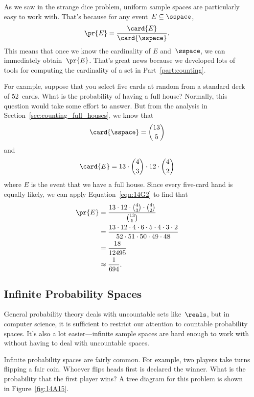 As we saw in the strange dice problem, uniform sample spaces are
particularly easy to work with.  That's because for any event~$E
\subseteq \sspace$,
\begin{equation}\label{eqn:14G2}
    \pr{E} = \frac{\card{E}}{\card{\sspace}}.
\end{equation}
This means that once we know the cardinality of $E$ and~$\sspace$, we
can immediately obtain~$\pr{E}$.  That's great news because we
developed lots of tools for computing the cardinality of a set in
Part~\ref{part:counting}.

For example, suppose that you select five cards at random from a
standard deck of 52~cards.  What is the probability of having a full
house?  Normally, this question would take some effort to answer.  But
from the analysis in Section~\ref{sec:counting_full_houses}, we know
that
\begin{equation*}
    \card{\sspace} = \binom{13}{5}
\end{equation*}
and
\begin{equation*}
    \card{E} = 13 \cdot \binom{4}{3} \cdot 12 \cdot \binom{4}{2}
\end{equation*}
where $E$ is the event that we have a full house.  Since every
five-card hand is equally likely, we can apply Equation~\ref{eqn:14G2}
to find that
\begin{align*}
\pr{E}  &= \frac{13 \cdot 12 \cdot \binom{4}{3} \cdot \binom{4}{2}}
                {\binom{13}{5}} \\
        &= \frac{13 \cdot 12 \cdot 4 \cdot 6 \cdot 5 \cdot 4 \cdot 3 \cdot 2}
                {52 \cdot 51 \cdot 50 \cdot 49 \cdot 48} \\
        &= \frac{18}{12495} \\
        &\approx \frac{1}{694}.
\end{align*}

\subsection{Infinite Probability Spaces}

General probability theory deals with uncountable sets like~$\reals$,
but in computer science, it is sufficient to restrict our attention to
countable probability spaces.  It's also a lot easier---infinite
sample spaces are hard enough to work with without having to deal with
uncountable spaces.

Infinite probability spaces are fairly common.  For example, two
players take turns flipping a fair coin.  Whoever flips heads first is
declared the winner.  What is the probability that the first player
wins?  A tree diagram for this problem is shown in
Figure~\ref{fig:14A15}.

